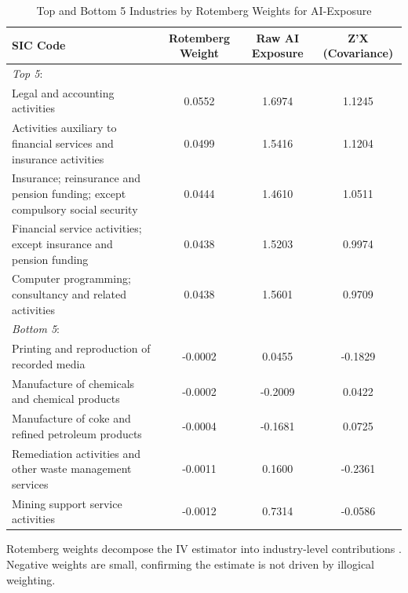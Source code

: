 \begin{table}[!htbp]
\caption{Top and Bottom 5 Industries by Rotemberg Weights for AI-Exposure}
\centering
\begin{threeparttable}
\begin{tabular}[t]{p{6.7cm}ccc}
\toprule
 SIC Code & Rotemberg Weight & Raw AI Exposure & Z'X (Covariance)\\
\midrule
\textit{Top 5}: &&&\\
Legal and accounting activities
 & 0.0552 & 1.6974 & 1.1245\\
 Activities auxiliary to financial services and insurance activities
 & 0.0499 & 1.5416 & 1.1204\\
 Insurance; reinsurance and pension funding; except compulsory social security
 & 0.0444 & 1.4610 & 1.0511\\
 Financial service activities; except insurance and pension funding
 & 0.0438 & 1.5203 & 0.9974\\
 Computer programming; consultancy and related activities
 & 0.0438 & 1.5601 & 0.9709\\
\addlinespace
\textit{Bottom 5}: &&&\\
Printing and reproduction of recorded media
& -0.0002 & 0.0455 & -0.1829\\
Manufacture of chemicals and chemical products
 & -0.0002 & -0.2009 & 0.0422\\
Manufacture of coke and refined petroleum products
 & -0.0004 & -0.1681 & 0.0725\\
Remediation activities and other waste management services
 & -0.0011 & 0.1600 & -0.2361\\
Mining support service activities
 & -0.0012 & 0.7314 & -0.0586\\
\bottomrule
\end{tabular}
\end{threeparttable}
\begin{tablenotes}
    \item Rotemberg weights decompose the IV estimator into industry-level contributions \citep{goldsmith2020bartik}. Negative weights are small, confirming the estimate is not driven by illogical weighting.
\end{tablenotes}
\label{ai_rotemberg}
\end{table}